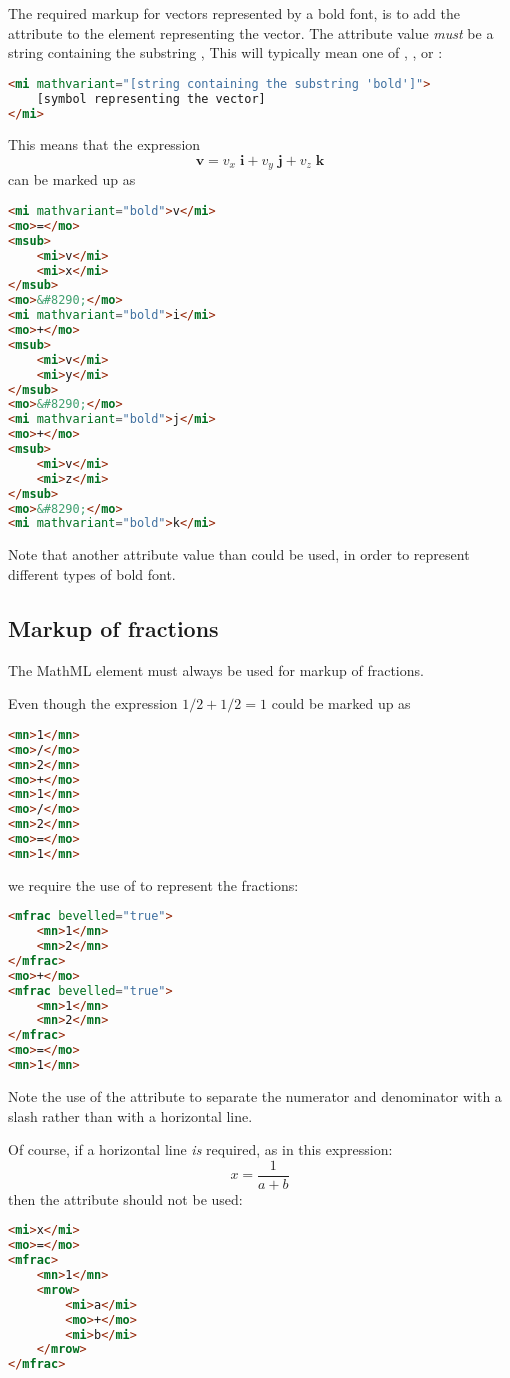 \documentclass[english,a4paper,11pt]{article}
\begin{document}
\medskip The required markup for vectors represented by a bold font, is to add the  attribute to the  element representing the vector. The attribute value \emph{must} be a string containing the substring , This will typically mean one of , ,  or :
\begin{lstlisting}[language=HTML]
<mi mathvariant="[string containing the substring 'bold']">
	[symbol representing the vector]
</mi>
\end{lstlisting}
This means that the expression
\begin{equation}
\mathbf{v} = v_x\;  \mathbf{i} + v_y\; \mathbf{j} + v_z\;  \mathbf{k}
\end{equation}
can be marked up as
\begin{lstlisting}[language=HTML]
<mi mathvariant="bold">v</mi>
<mo>=</mo>
<msub>
	<mi>v</mi>
	<mi>x</mi>
</msub>
<mo>&#8290;</mo>
<mi mathvariant="bold">i</mi>
<mo>+</mo>
<msub>
	<mi>v</mi>
	<mi>y</mi>
</msub>
<mo>&#8290;</mo>
<mi mathvariant="bold">j</mi>
<mo>+</mo>
<msub>
	<mi>v</mi>
	<mi>z</mi>
</msub>
<mo>&#8290;</mo>
<mi mathvariant="bold">k</mi>
\end{lstlisting}
Note that another attribute value than  could be used, in order to represent different types of bold font.

\subsection{Markup of fractions}
The MathML element  must always be used for markup of fractions.

Even though the expression $1/2 + 1/2 =1$ could be marked up as
\begin{lstlisting}[language=HTML]
<mn>1</mn>
<mo>/</mo>
<mn>2</mn>
<mo>+</mo>
<mn>1</mn>
<mo>/</mo>
<mn>2</mn>
<mo>=</mo>
<mn>1</mn>
\end{lstlisting}
we require the use of  to represent the fractions:
\begin{lstlisting}[language=HTML]
<mfrac bevelled="true">
	<mn>1</mn>
	<mn>2</mn>
</mfrac>
<mo>+</mo>
<mfrac bevelled="true">
	<mn>1</mn>
	<mn>2</mn>
</mfrac>
<mo>=</mo>
<mn>1</mn>
\end{lstlisting}
Note the use of the  attribute to separate the numerator and denominator  with a slash rather than with a horizontal line.

Of course, if a horizontal line \emph{is} required, as in this expression:
\begin{equation}
x = \frac{1}{a + b}
\end{equation}
then the  attribute should not be used:
\begin{lstlisting}[language=HTML]
<mi>x</mi>
<mo>=</mo>
<mfrac>
	<mn>1</mn>
	<mrow>
		<mi>a</mi>
		<mo>+</mo>
		<mi>b</mi>
	</mrow>
</mfrac>
\end{lstlisting}
\end{document}
